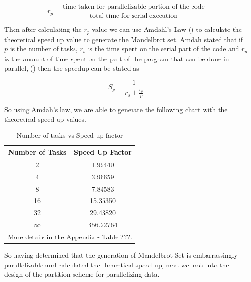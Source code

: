 \documentclass[conference]{IEEEtran}
\begin{document}
			\begin{equation}
				r_p = \frac{\text{time taken for parallelizable portion of the code}}{\text{total time for serial execution}} \label{rp}
			\end{equation}
			
			Then after calculating the $r_p$ value we can use Amdahl's Law () to calculate the theoretical speed up value to generate the Mandelbrot set. Amdah stated that if $p$ is the number of tasks, $r_s$ is the time spent on the serial part of the code and $r_p$ is the amount of time spent on the part of the program that can be done in parallel, () then the speedup can be stated as 
			
			\begin{equation}
				S_p = \frac{1}{r_s + \frac{r_p}{p}}
			\end{equation}
			
			So using Amdah's law, we are able to generate the following chart with the theoretical speed up values.
			
			\begin{table}[!h]\caption{Number of tasks vs Speed up factor}
				\begin{center}
					\renewcommand{\arraystretch}{1.2}
					\begin{tabular}{|c|c|} 
						\hline
						\textbf{Number of Tasks} & \textbf{Speed Up Factor} \\ \hline
						2                  & 1.99440                     \\
						4                  & 3.96659                     \\
						8                   & 7.84583                     \\
						16                 & 15.35350                       \\
						32                & 29.43820                      \\
						 $\infty$      & 356.22764                       \\ \hline
						 \multicolumn{2}{l}{More details in the Appendix - Table ???.}
						 
					\end{tabular}
				\end{center}
			\end{table}
			
			So having determined that the generation of Mandelbrot Set is embarrassingly parallelizable and calculated the theoretical speed up, next we look into the design of the partition scheme for parallelizing data.
	
\end{document}
